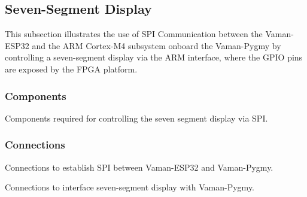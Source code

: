 \subsection{Seven-Segment Display}
This subsection illustrates the use of SPI Communication between the Vaman-ESP32
and the ARM Cortex-M4 subsystem onboard the Vaman-Pygmy by controlling a
seven-segment display via the ARM interface, where the GPIO pins are exposed by
the FPGA platform.

\subsubsection{Components}
\begin{table}[!ht]
    \centering
    
    \caption{Components required for controlling the seven segment display via SPI.}
    \label{tab:esp32-m4-fpga-sevenseg-components}
\end{table}

\subsubsection{Connections}
\begin{table}[!ht]
    \centering
    
    \caption{Connections to establish SPI between Vaman-ESP32 and Vaman-Pygmy.}
    \label{tab:esp32-m4-fpga-sevenseg-vaman-connections}
\end{table}

\begin{table}[!ht]
    \centering
    
    \caption{Connections to interface seven-segment display with Vaman-Pygmy.}
    \label{tab:esp32-m4-fpga-sevenseg-display-connections}
\end{table}

